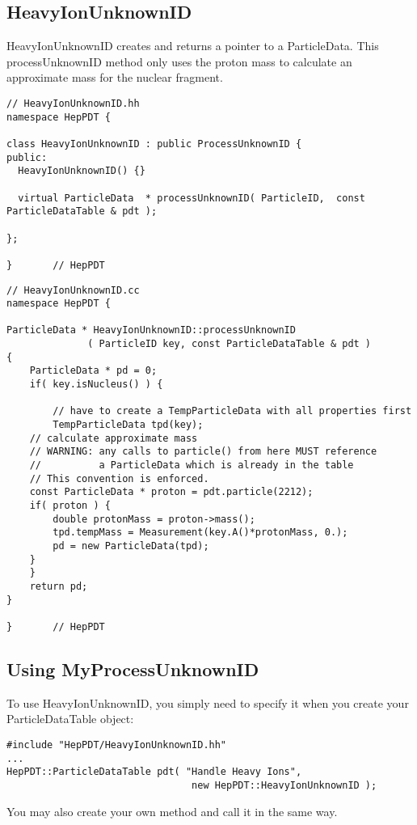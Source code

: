 \subsection { HeavyIonUnknownID }

HeavyIonUnknownID creates and returns a pointer to a ParticleData.
This processUnknownID method only uses the proton mass to calculate
an approximate mass for the nuclear fragment.

\begin{verbatim}
// HeavyIonUnknownID.hh
namespace HepPDT {

class HeavyIonUnknownID : public ProcessUnknownID {
public:
  HeavyIonUnknownID() {}

  virtual ParticleData  * processUnknownID( ParticleID,  const ParticleDataTable & pdt );
    
};

}       // HepPDT

\end{verbatim}

\begin{verbatim}
// HeavyIonUnknownID.cc
namespace HepPDT {

ParticleData * HeavyIonUnknownID::processUnknownID
              ( ParticleID key, const ParticleDataTable & pdt ) 
{ 
    ParticleData * pd = 0;
    if( key.isNucleus() ) {
     
        // have to create a TempParticleData with all properties first
        TempParticleData tpd(key);
	// calculate approximate mass
	// WARNING: any calls to particle() from here MUST reference 
	//          a ParticleData which is already in the table
	// This convention is enforced.
	const ParticleData * proton = pdt.particle(2212);
	if( proton ) {
	    double protonMass = proton->mass();
	    tpd.tempMass = Measurement(key.A()*protonMass, 0.);
	    pd = new ParticleData(tpd);
	}
    }
    return pd;
}

}       // HepPDT

\end{verbatim}


\subsection { Using MyProcessUnknownID }

To use HeavyIonUnknownID, you simply need to specify it when you
create your ParticleDataTable object: 
\begin{verbatim}
#include "HepPDT/HeavyIonUnknownID.hh"
...
HepPDT::ParticleDataTable pdt( "Handle Heavy Ions", 
                                new HepPDT::HeavyIonUnknownID );
\end{verbatim}

You may also create your own method and call it in the same way.


\vfill\eject
